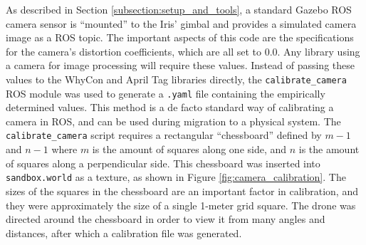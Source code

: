 \label{section:camera_calibration}

As described in Section \ref{subsection:setup_and_tools}, a standard Gazebo ROS camera sensor is ``mounted'' to the Iris' gimbal and provides a simulated camera image as a ROS topic. The important aspects of this code are the specifications for the camera's distortion coefficients, which are all set to 0.0. Any library using a camera for image processing will require these values. Instead of passing these values to the WhyCon and April Tag libraries directly, the \texttt{calibrate\_camera} ROS module was used to generate a \texttt{.yaml} file containing the empirically determined values. This method is a de facto standard way of calibrating a camera in ROS, and can be used during migration to a physical system.
The \texttt{calibrate\_camera} script requires a rectangular ``chessboard'' defined by $m-1$ and $n-1$ where $m$ is the amount of squares along one side, and $n$ is the amount of squares along a perpendicular side. This chessboard was inserted into \texttt{sandbox.world} as a texture, as shown in Figure \ref{fig:camera_calibration}. The sizes of the squares in the chessboard are an important factor in calibration, and they were approximately the size of a single 1-meter grid square. The drone was directed around the chessboard in order to view it from many angles and distances, after which a calibration file was generated.

